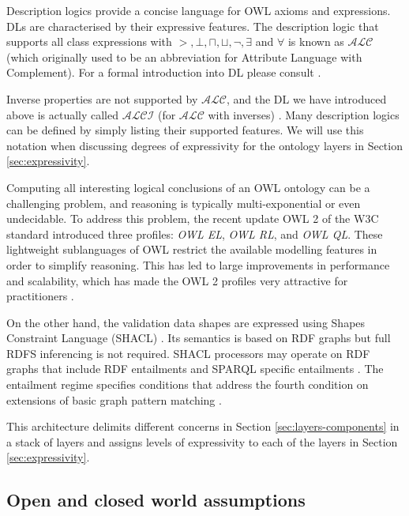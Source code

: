 	Description logics provide a concise language for OWL axioms and expressions. DLs are characterised by their expressive features. The description logic that supports all class expressions with $>, \bot, \sqcap, \sqcup, \neg, \exists$ and $\forall$ is known as $\mathcal{ALC}$ (which originally used to be an abbreviation for Attribute Language with Complement). For a formal introduction into DL please consult \citet{dl-baader2004description}.
	
	Inverse properties are not supported by $\mathcal{ALC}$, and the DL we have introduced above is actually called $\mathcal{ALCI}$ (for $\mathcal{ALC}$ with inverses) \cite{krotzsch2012owl}. Many description logics can be defined by simply listing their supported features. We will use this notation when discussing degrees of expressivity for the ontology layers in Section \ref{sec:expressivity}.
	
	Computing all interesting logical conclusions of an OWL ontology can be a challenging problem, and reasoning is typically multi-exponential or even undecidable. To address this problem, the recent update OWL 2 of the W3C standard \citep{owl2.0,owl2} introduced three profiles: \textit{OWL EL}, \textit{OWL RL}, and \textit{OWL QL}. These lightweight sublanguages of OWL restrict the available modelling features in order to simplify reasoning. This has led to large improvements in performance and scalability, which has made the OWL 2 profiles very attractive for practitioners \citep{krotzsch2012owl}.
	
	On the other hand, the validation data shapes are expressed using Shapes Constraint Language (SHACL) \cite{shacl-spec}. Its semantics is based on RDF graphs but full RDFS inferencing is not required. SHACL processors may operate on RDF graphs that include RDF entailments \citep{rdf11-semantics} and SPARQL specific entailments \citep{sparql11-entailment}. The entailment regime specifies conditions that address the fourth condition on extensions of basic graph pattern matching \citep{rdf-semantics,rdf11-semantics}. 
	
	This architecture delimits different concerns in Section \ref{sec:layers-components} in a stack of layers and assigns levels of expressivity to each of the layers in Section \ref{sec:expressivity}.
	
	\subsection{Open and closed world assumptions}
	\label{sec:world-assumption}
	

